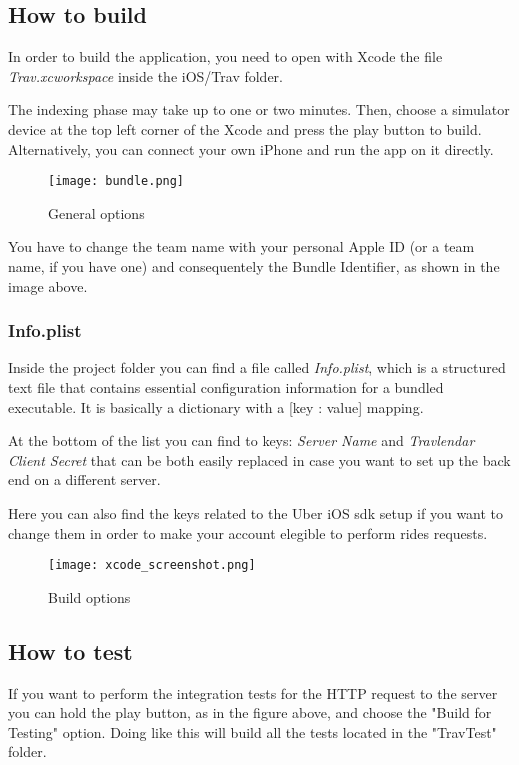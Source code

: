 \subsection{How to build}

In order to build the application, you need to open with Xcode the file \textit{Trav.xcworkspace} inside the iOS/Trav folder.

The indexing phase may take up to one or two minutes. Then, choose a simulator device at the top left corner of the Xcode and press the play button to build. Alternatively, you can connect your own iPhone and run the app on it directly.

\begin{figure}[H]
	\centering
	\texttt{[image: bundle.png]}
	\caption{General options}
\end{figure}

You have to change the team name with your personal Apple ID (or a team name, if you have one) and consequentely the Bundle Identifier, as shown in the image above.

\subsubsection*{Info.plist}
Inside the project folder you can find a file called \textit{Info.plist}, which is a structured text file that contains essential configuration information for a bundled executable.
It is basically a dictionary with a [key : value] mapping.

At the bottom of the list you can find to keys: \textit{Server Name} and \textit{Travlendar Client Secret} that can be both easily replaced in case you want to set up the back end on a different server.

Here you can also find the keys related to the Uber iOS sdk setup if you want to change them in order to make your account elegible to perform rides requests.

\begin{figure}[H]
	\centering
	\texttt{[image: xcode\_screenshot.png]}
	\caption{Build options}
\end{figure}

\subsection{How to test}

If you want to perform the integration tests for the HTTP request to the server you can hold the play button, as in the figure above, and choose the "Build for Testing" option.
Doing like this will build all the tests located in the "TravTest" folder.

